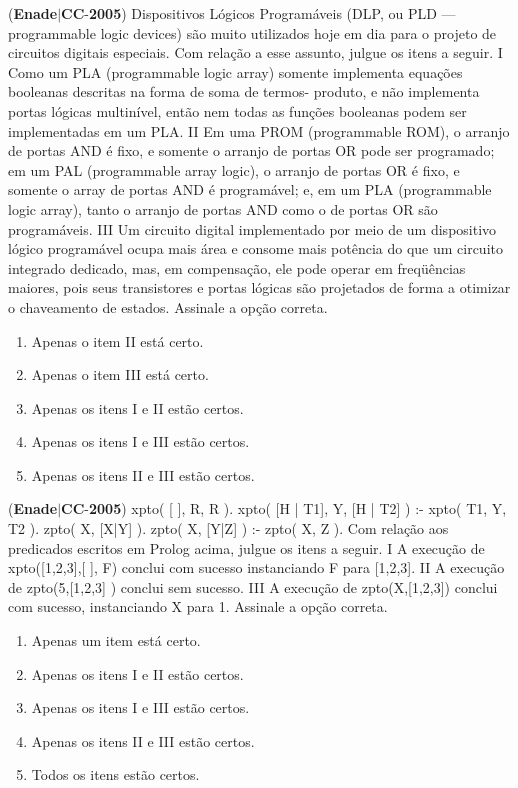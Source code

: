 \documentclass{exam}
\begin{document}
\begin{questions}
\question (\textbf{Enade}$|$\textbf{CC}-\textbf{2005}) Dispositivos Lógicos Programáveis (DLP, ou PLD — programmable
logic devices) são muito utilizados hoje em dia para o projeto de
circuitos digitais especiais. Com relação a esse assunto, julgue os
itens a seguir.
I Como um PLA (programmable logic array) somente implementa
equações booleanas descritas na forma de soma de termos-
produto, e não implementa portas lógicas multinível, então nem
todas as funções booleanas podem ser implementadas em um
PLA.
II Em uma PROM (programmable ROM), o arranjo de portas AND
é fixo, e somente o arranjo de portas OR pode ser programado; em
um PAL (programmable array logic), o arranjo de portas OR é
fixo, e somente o array de portas AND é programável; e, em um
PLA (programmable logic array), tanto o arranjo de portas AND
como o de portas OR são programáveis.
III Um circuito digital implementado por meio de um dispositivo
lógico programável ocupa mais área e consome mais potência do
que um circuito integrado dedicado, mas, em compensação, ele
pode operar em freqüências maiores, pois seus transistores e
portas lógicas são projetados de forma a otimizar o chaveamento
de estados.
Assinale a opção correta.
	\begin{enumerate}[label=\alph*)]
		\item  Apenas o item II está certo.
		\item  Apenas o item III está certo.
		\item  Apenas os itens I e II estão certos.
		\item  Apenas os itens I e III estão certos.
		\item  Apenas os itens II e III estão certos.

	\end{enumerate}

\question (\textbf{Enade}$|$\textbf{CC}-\textbf{2005}) xpto( [ ], R, R ).
xpto( [H | T1], Y, [H | T2] ) :- xpto( T1, Y, T2 ).
zpto( X, [X|Y] ).
zpto( X, [Y|Z] ) :- zpto( X, Z ).
Com relação aos predicados escritos em Prolog acima, julgue os
itens a seguir.
I A execução de xpto([1,2,3],[ ], F) conclui com sucesso
instanciando F para [1,2,3].
II A execução de zpto(5,[1,2,3] ) conclui sem sucesso.
III A execução de zpto(X,[1,2,3]) conclui com sucesso,
instanciando X para 1.
Assinale a opção correta.
	\begin{enumerate}[label=\alph*)]
		\item  Apenas um item está certo.
		\item  Apenas os itens I e II estão certos.
		\item  Apenas os itens I e III estão certos.
		\item  Apenas os itens II e III estão certos.
		\item  Todos os itens estão certos.


\end{enumerate}
\end{questions}
\end{document}
